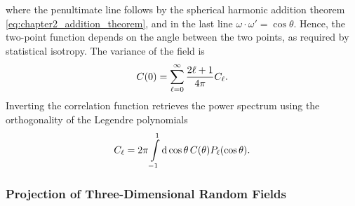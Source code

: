%
where the penultimate line follows by the spherical harmonic addition theorem \cref{eq:chapter2_addition_theorem}, and in the last line \({\omega\cdot\omega' = \cos{\theta}}\).
Hence, the two-point function depends on the angle between the two points, as required by statistical isotropy.
The variance of the field is
%
\begin{equation}
    C(0)
    = \sum\limits_{\ell=0}^{\infty} \frac{2\ell+1}{4\pi} C_{\ell}.
\end{equation}
%
Inverting the correlation function retrieves the power spectrum using the orthogonality of the Legendre polynomials
%
\begin{equation}
    C_{\ell}
    = 2\pi \int\limits_{-1}^{1} \dd{\cos{\theta}} C(\theta) P_{\ell}(\cos{\theta}).
\end{equation}

\subsubsection{Projection of Three-Dimensional Random Fields}

